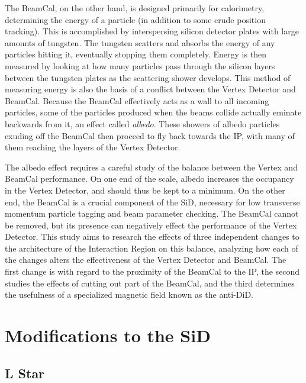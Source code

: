 \documentclass{report}
\begin{document}
                The BeamCal, on the other hand, is designed primarily for calorimetry, determining the energy of a particle (in addition to some crude position tracking). This is accomplished by interspersing silicon detector plates with large amounts of tungsten. The tungsten scatters and absorbs the energy of any particles hitting it, eventually stopping them completely. Energy is then measured by looking at how many particles pass through the silicon layers between the tungsten plates as the scattering shower develops. This method of measuring energy is also the basis of a conflict between the Vertex Detector and BeamCal. Because the BeamCal effectively acts as a wall to all incoming particles, some of the particles produced when the beams collide actually eminate backwards from it, an effect called \textit{albedo}. These showers of albedo particles exuding off the BeamCal then proceed to fly back towards the IP, with many of them reaching the layers of the Vertex Detector.
                
                The albedo effect requires a careful study of the balance between the Vertex and BeamCal performance. On one end of the scale, albedo increases the occupancy in the Vertex Detector, and should thus be kept to a minimum. On the other end, the BeamCal is a crucial component of the SiD, necessary for low transverse momentum particle tagging and beam parameter checking. The BeamCal cannot be removed, but its presence can negatively effect the performance of the Vertex Detector. This study aims to research the effects of three independent changes to the architecture of the Interaction Region on this balance, analyzing how each of the changes alters the effectiveness of the Vertex Detector and BeamCal. The first change is with regard to the proximity of the BeamCal to the IP, the second studies the effects of cutting out part of the BeamCal, and the third determines the usefulness of a specialized magnetic field known as the anti-DiD.



        \section{Modifications to the SiD} \label{sect:sid_mods}
            \subsection{L Star}
\end{document}

